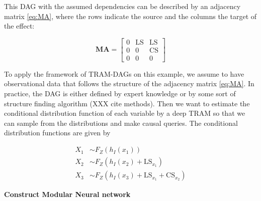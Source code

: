 This DAG with the assumed dependencies can be described by an adjacency matrix \ref{eq:MA}, where the rows indicate the source and the columns the target of the effect: 


\begin{equation}
\mathbf{MA} =
\begin{bmatrix}
  0 & \text{LS} & \text{LS} \\
  0 & 0  & \text{CS} \\
  0 & 0  & 0
\end{bmatrix}
\label{eq:MA}
\end{equation}

To apply the framework of TRAM-DAGs on this example, we assume to have observational data that follows the structure of the adjacency matrix \ref{eq:MA}. In practice, the DAG is either defined by expert knowledge or by some sort of structure finding algorithm (XXX cite methods). Then we want to estimate the conditional distribution function of each variable by a deep TRAM so that we can sample from the distributions and make causal queries. The conditional distribution functions are given by


\[
\begin{aligned}
X_1 &\sim F_Z(h_I(x_1)) \\
X_2 &\sim F_Z(h_I(x_2) + \mathrm{LS}_{x_1}) \\
X_3 &\sim F_Z(h_I(x_3) + \mathrm{LS}_{x_1} + \mathrm{CS}_{x_2})
\end{aligned}
\]


\textbf{Construct Modular Neural network}

